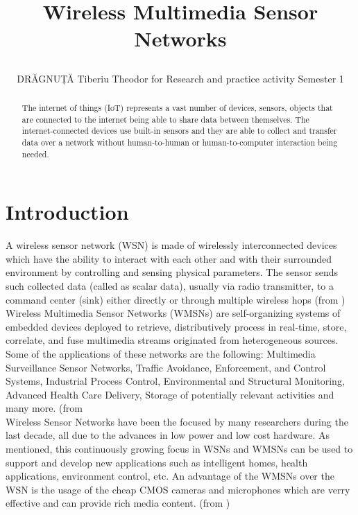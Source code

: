 \documentclass[conference]{IEEEtran}
\begin{document}
\title{Wireless Multimedia Sensor Networks

}

\author{DRĂGNUȚĂ Tiberiu Theodor for Research and practice activity Semester 1}


\maketitle

\begin{abstract}
The internet of things (IoT) represents a vast number of devices, sensors, objects that are connected to the internet being able to share data between themselves. The internet-connected devices use built-in sensors and they are able to collect and transfer data over a network without human-to-human or human-to-computer interaction being needed.
\end{abstract}

\IEEEpeerreviewmaketitle

\section{Introduction}
A wireless sensor network (WSN) is made of wirelessly interconnected devices which have the ability to interact with each other and with their surrounded environment by controlling and sensing physical parameters.  The sensor sends such collected data (called as scalar data), usually via radio transmitter, to a command center (sink) either directly or through multiple wireless hops (from \citet{Hamd01})
Wireless Multimedia Sensor Networks (WMSNs) are self-organizing systems of embedded devices deployed to retrieve, distributively process in real-time, store, correlate, and fuse multimedia streams originated from heterogeneous sources.
\\ \indent Some of the applications of these networks are the following: Multimedia Surveillance Sensor Networks, Traffic Avoidance, Enforcement, and Control Systems, Industrial Process Control, Environmental and Structural Monitoring, Advanced Health Care Delivery, Storage of potentially relevant activities and many more. (from \citet{Inaf02}
\\ \indent Wireless Sensor Networks have been the focused by many researchers during the last decade, all due to the advances in low power and low cost hardware. As mentioned, this continuously growing focus in WSNs and WMSNs can be used to support and develop new applications such as intelligent homes, health applications, environment control, etc. An advantage of the WMSNs over the WSN is the usage of the cheap CMOS cameras and microphones which are verry effective and can provide rich media content. (from \citet{Hamd01})
\end{document}
